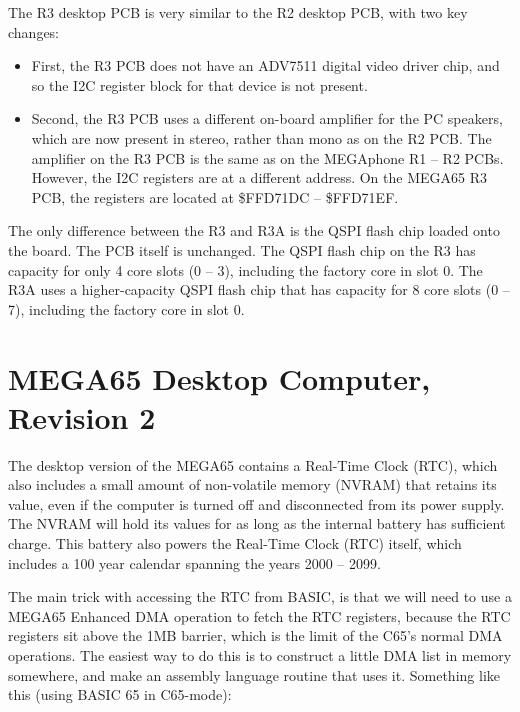 The R3 desktop PCB is very similar to the R2 desktop PCB, with two key changes:

\begin{itemize}
\item First, the R3 PCB does not have an ADV7511 digital video driver chip, and so the I2C register block for that device is not present.
\item Second, the R3 PCB uses a different on-board amplifier for the PC speakers, which are now present in stereo, rather than mono
  as on the R2 PCB.  The amplifier on the R3 PCB is the same as on the MEGAphone R1 -- R2 PCBs.
  However, the I2C registers are at a different address.  On the MEGA65 R3 PCB, the registers are located at \$FFD71DC -- \$FFD71EF.
\end{itemize}

The only difference between the R3 and R3A is the QSPI flash chip loaded onto the board. The PCB itself is unchanged. The QSPI flash chip on the R3 has capacity for only 4 core slots (0 -- 3), including the factory core in slot 0.  The R3A uses a higher-capacity QSPI flash chip that has capacity for 8 core slots (0 -- 7), including the factory core in slot 0.



\section{MEGA65 Desktop Computer, Revision 2}

The desktop version of the MEGA65 contains a Real-Time Clock (RTC), which also includes a small amount of non-volatile memory (NVRAM)
that retains its value, even if the computer is turned off and disconnected from its power supply. The NVRAM will hold its values
for as long as the internal battery has sufficient charge.  This battery also powers the Real-Time Clock (RTC) itself, which includes
a 100 year calendar spanning the years 2000 -- 2099.

The main trick with accessing the RTC from BASIC, is that we will need to use a MEGA65 Enhanced DMA operation to fetch the RTC registers, because the RTC registers sit above the 1MB barrier, which is the limit of the C65's normal DMA operations.  The easiest way to do this is to construct a little DMA list in memory somewhere, and make an assembly language routine that uses it.  Something like this (using BASIC 65 in C65-mode):

